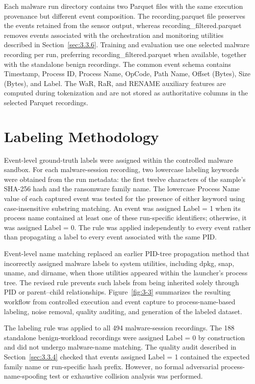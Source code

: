 Each malware run directory contains two Parquet files with the same execution provenance but different event composition. The recording.parquet file preserves the events retained from the sensor output, whereas recording\_\allowbreak{}filtered.parquet removes events associated with the orchestration and monitoring utilities described in Section~\ref{sec:3.3.6}. Training and evaluation use one selected malware recording per run, preferring recording\_\allowbreak{}filtered.parquet when available, together with the standalone benign recordings. The common event schema contains Timestamp, Process ID, Process Name, OpCode, Path Name, Offset (Bytes), Size (Bytes), and Label. The WaR, RaR, and RENAME auxiliary features are computed during tokenization and are not stored as authoritative columns in the selected Parquet recordings.

\section{Labeling Methodology}\label{sec:3.3.3}

Event-level ground-truth labels were assigned within the controlled malware sandbox. For each malware-session recording, two lowercase labeling keywords were obtained from the run metadata: the first twelve characters of the sample's SHA-256 hash and the ransomware family name. The lowercase Process Name value of each captured event was tested for the presence of either keyword using case-insensitive substring matching. An event was assigned Label = 1 when its process name contained at least one of these run-specific identifiers; otherwise, it was assigned Label = 0. The rule was applied independently to every event rather than propagating a label to every event associated with the same PID.

Event-level name matching replaced an earlier PID-tree propagation method that incorrectly assigned malware labels to system utilities, including dpkg, snap, uname, and dirname, when those utilities appeared within the launcher's process tree. The revised rule prevents such labels from being inherited solely through PID or parent--child relationships. Figure~\ref{fig:3-3} summarizes the resulting workflow from controlled execution and event capture to process-name-based labeling, noise removal, quality auditing, and generation of the labeled dataset.

The labeling rule was applied to all 494 malware-session recordings. The 188 standalone benign-workload recordings were assigned Label = 0 by construction and did not undergo malware-name matching. The quality audit described in Section~\ref{sec:3.3.4} checked that events assigned Label = 1 contained the expected family name or run-specific hash prefix. However, no formal adversarial process-name-spoofing test or exhaustive collision analysis was performed.

